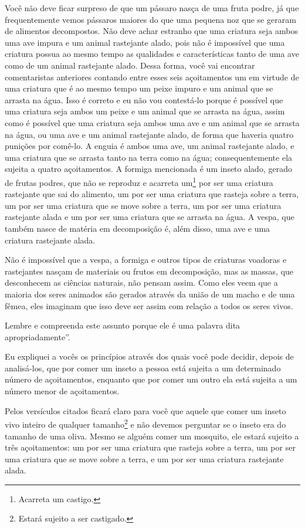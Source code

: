 Você não deve ficar surpreso de que um pássaro nasça de uma fruta podre,
já que frequentemente vemos pássaros maiores do que uma pequena noz que
se geraram de alimentos decompostos. Não deve achar estranho que uma
criatura seja ambos uma ave impura e um animal rastejante alado, pois
não é impossível que uma criatura possua ao mesmo tempo as qualidades e
características tanto de uma ave como de um animal rastejante alado.
Dessa forma, você vai encontrar comentaristas anteriores contando entre
esses seis açoitamentos um em virtude de uma criatura que é ao mesmo
tempo um peixe impuro e um animal que se arrasta na água. Isso é
correto e eu não vou contestá-lo porque é possível que uma criatura seja
ambos um peixe e um animal que se arrasta na água, assim como é possível
que uma criatura seja ambos uma ave e um animal que se arrasta na água,
ou uma ave e um animal rastejante alado, de forma que haveria quatro
punições por comê-lo. A enguia é ambos uma ave, um animal rastejante
alado, e uma criatura que se arrasta tanto na terra como na água;
consequentemente ela sujeita a quatro açoitamentos. A formiga
mencionada é um inseto alado, gerado de frutas podres, que não se
reproduz e acarreta um\footnote{Acarreta um castigo.} por ser uma criatura
rastejante que sai do alimento, um por ser uma criatura que rasteja
sobre a terra, um por ser uma criatura que se move sobre a terra, um por
ser uma criatura rastejante alada e um por ser uma criatura que se
arrasta na água. A vespa, que também nasce de matéria em decomposição é,
além disso, uma ave e uma criatura rastejante alada.

Não é impossível que a vespa, a formiga e outros tipos de criaturas
voadoras e rastejantes nasçam de materiais ou frutos em decomposição,
mas as massas, que desconhecem as ciências naturais, não pensam assim.
Como eles veem que a maioria dos seres animados são gerados através da
união de um macho e de uma fêmea, eles imaginam que isso deve ser assim
com relação a todos os seres vivos.

Lembre e compreenda este assunto porque ele é uma palavra dita
apropriadamente''.

Eu expliquei a vocês os princípios através dos quais você pode decidir,
depois de analisá-los, que por comer um inseto a pessoa está sujeita a
um determinado número de açoitamentos, enquanto que por comer um outro
ela está sujeita a um número menor de açoitamentos.

Pelos versículos citados ficará claro para você que aquele que comer um
inseto vivo inteiro de qualquer tamanho\footnote{Estará sujeito a ser castigado.} e não
devemos perguntar se o inseto era do tamanho de uma oliva. Mesmo se
alguém comer um mosquito, ele estará sujeito a três açoitamentos: um
por ser uma criatura que rasteja sobre a terra, um por ser uma criatura
que se move sobre a terra, e um por ser uma criatura rastejante alada.

